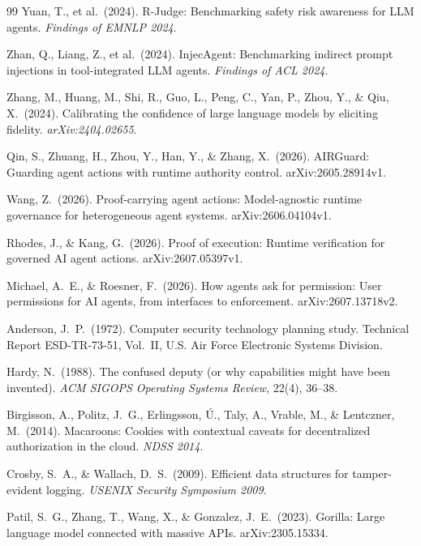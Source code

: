 \documentclass[10pt,twocolumn]{article}
\begin{document}
\begin{thebibliography}{99}
Yuan, T., et al.\ (2024).
R-Judge: Benchmarking safety risk awareness for LLM agents.
\emph{Findings of EMNLP 2024}.

Zhan, Q., Liang, Z., et al.\ (2024).
InjecAgent: Benchmarking indirect prompt injections in tool-integrated LLM
agents.
\emph{Findings of ACL 2024}.

Zhang, M., Huang, M., Shi, R., Guo, L., Peng, C., Yan, P., Zhou, Y.,
\& Qiu, X.\ (2024).
Calibrating the confidence of large language models by eliciting fidelity.
\emph{arXiv:2404.02655}.

Qin, S., Zhuang, H., Zhou, Y., Han, Y., \& Zhang, X.\ (2026).
AIRGuard: Guarding agent actions with runtime authority control.
arXiv:2605.28914v1.

Wang, Z.\ (2026).
Proof-carrying agent actions: Model-agnostic runtime governance for
heterogeneous agent systems.
arXiv:2606.04104v1.

Rhodes, J., \& Kang, G.\ (2026).
Proof of execution: Runtime verification for governed AI agent actions.
arXiv:2607.05397v1.

Michael, A.~E., \& Roesner, F.\ (2026).
How agents ask for permission: User permissions for AI agents, from
interfaces to enforcement.
arXiv:2607.13718v2.

Anderson, J.~P.\ (1972).
Computer security technology planning study.
Technical Report ESD-TR-73-51, Vol.~II, U.S. Air Force Electronic Systems
Division.

Hardy, N.\ (1988).
The confused deputy (or why capabilities might have been invented).
\emph{ACM SIGOPS Operating Systems Review}, 22(4), 36--38.

Birgisson, A., Politz, J.~G., Erlingsson, \'U., Taly, A., Vrable, M., \&
Lentczner, M.\ (2014).
Macaroons: Cookies with contextual caveats for decentralized authorization
in the cloud.
\emph{NDSS 2014}.

Crosby, S.~A., \& Wallach, D.~S.\ (2009).
Efficient data structures for tamper-evident logging.
\emph{USENIX Security Symposium 2009}.

Patil, S.~G., Zhang, T., Wang, X., \& Gonzalez, J.~E.\ (2023).
Gorilla: Large language model connected with massive APIs.
arXiv:2305.15334.


\end{thebibliography}
\end{document}
